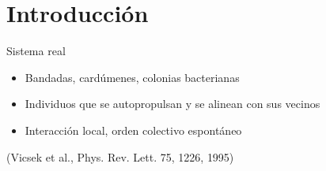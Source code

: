\documentclass[aspectratio=169,11pt]{beamer}
\newcommand{\cita}[1]{{\scriptsize\color{gris}(#1)}}
\begin{document}
\section{Introducción}

\begin{frame}{Sistema real}
    \vspace{1.4em}
    \begin{itemize}
        \setlength{\itemsep}{1.5em}
        \item Bandadas, cardúmenes, colonias bacterianas
        \item Individuos que se \alert{autopropulsan} y se \alert{alinean}
              con sus vecinos
        \item Interacción \alert{local}, orden colectivo \alert{espontáneo}
    \end{itemize}
    \vspace{2.0em}
    \cita{Vicsek et al., Phys. Rev. Lett. 75, 1226, 1995}
\end{frame}
\end{document}
